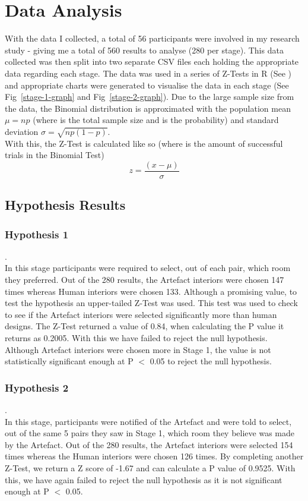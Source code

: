 \section{Data Analysis}
With the data I collected, a total of 56 participants were involved in my research study - giving me a total of 560 results to analyse (280 per stage). This data collected was then split into two separate CSV files each holding the appropriate data regarding each stage. The data was used in a series of Z-Tests in R (See \hyperref[append:g]{}) and appropriate charts were generated to visualise the data in each stage (See Fig~\ref{stage-1-graph} and Fig~\ref{stage-2-graph}).
Due to the large sample size from the data, the Binomial distribution is approximated with the population mean \(\mu = np\) (where  is the total sample size and  is the probability) and standard deviation \(\sigma = \sqrt{np(1-p)}\).
\\
With this, the Z-Test is calculated like so (where  is the amount of successful trials in the Binomial Test) \cite[Chapter~6]{zar-jerrold}
\[z = \frac{(x - \mu ) }{\sigma }\]

\subsection{Hypothesis Results}
\subsubsection{Hypothesis 1}
.\\
In this stage participants were required to select, out of each pair, which room they preferred. Out of the 280 results, the Artefact interiors were chosen 147 times whereas Human interiors were chosen 133. Although a promising value, to test the hypothesis an upper-tailed Z-Test was used.
This test was used to check to see if the Artefact interiors were selected significantly more than human designs. The Z-Test returned a value of 0.84, when calculating the P value it returns as 0.2005. With this we have failed to reject the null hypothesis. Although Artefact interiors were chosen more in Stage 1, the value is not statistically significant enough at P $<$ 0.05 to reject the null hypothesis.
\subsubsection{Hypothesis 2}
.\\
In this stage, participants were notified of the Artefact and were told to select, out of the same 5 pairs they saw in Stage 1, which room they believe was made by the Artefact. Out of the 280 results, the Artefact interiors were selected 154 times whereas the Human interiors were chosen 126 times. By completing another Z-Test, we return a Z score of -1.67 and can calculate a P value of 0.9525. With this, we have again failed to reject the null hypothesis as it is not significant enough at P $<$ 0.05.

